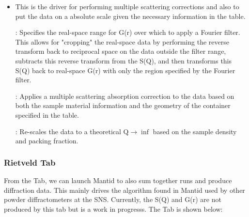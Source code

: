 \noindent{}

\begin{itemize}

\item {} This is the driver for performing multiple scattering corrections and also to put the data on a absolute scale given the necessary information in the table. 

: Specifies the real-space range for G(r) over which to apply a Fourier filter. This allows for "cropping" the real-space data by performing the reverse transform back to reciprocal space on the data outside the filter range, subtracts this reverse transform from the S(Q), and then transforms this S(Q) back to real-space G(r) with only the region specified by the Fourier filter.

: Applies a multiple scattering absorption correction to the data based on both the sample material information and the geometry of the container specified in the table.

: Re-scales the data to a theoretical $\text{Q} \rightarrow \inf $ based on the sample density and packing fraction.


\end{itemize} 


\subsubsection{Rietveld Tab}

From the  Tab, we can launch Mantid to also sum together runs and produce diffraction data. This mainly drives the \snspowderreduction algorithm found in Mantid used by other powder diffractometers at the SNS. Currently, the S(Q) and G(r) are not produced by this tab but is a work in progresss. The  Tab is shown below:

\noindent{}

